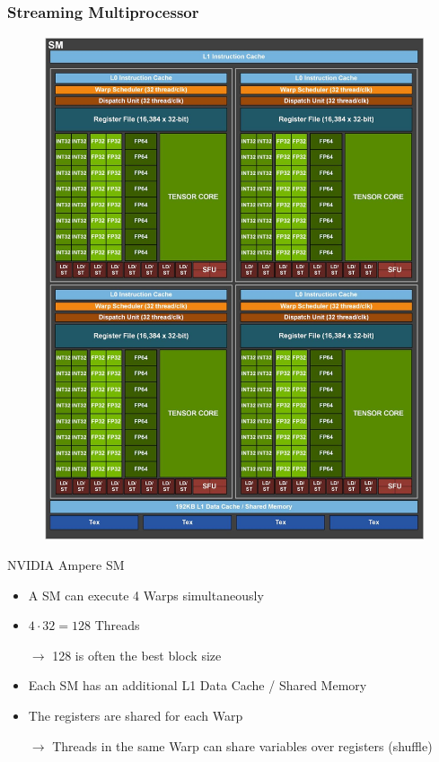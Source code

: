 \documentclass[aspectratio=169,handout]{beamer}
\begin{document}
\frame
{
	\frametitle{Streaming Multiprocessor}
	\begin{minipage}{0.3\linewidth}
	\begin{figure}
		\includegraphics[height=0.8\textheight]{ampere_sm}
	\end{figure}
	\centering
	NVIDIA Ampere SM
	\end{minipage}
	\begin{minipage}{0.68\linewidth}
\begin{itemize}
	\item A SM can execute 4 Warps simultaneously
	\item $4 \cdot 32 = 128$ Threads
	\item[$\rightarrow$] 128 is often the best block size
	\item Each SM has an additional L1 Data Cache / Shared Memory
	\item The registers are shared for each Warp
	\item[$\rightarrow$] Threads in the same Warp can share variables over registers (shuffle)
\end{itemize}
	\end{minipage}
	
}
\end{document}
